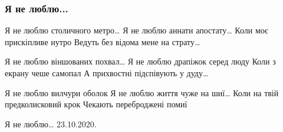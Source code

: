  
 
 

\subsubsection{Я не люблю...}

Я не люблю столичного метро…
Я не люблю аннати апостату…
Коли моє прискіпливе нутро
Ведуть без відома мене на страту…

Я не люблю віншованих похвал…
Я не люблю драпіжок серед люду
Коли з екрану чеше самопал
А прихвостні підспівують у дуду…

Я не люблю вилчури оболок
Я не люблю життя чуже на шиї…
Коли на твій предколисковий крок
Чекають переброджені помиї

Я не люблю…
23.10.2020.

